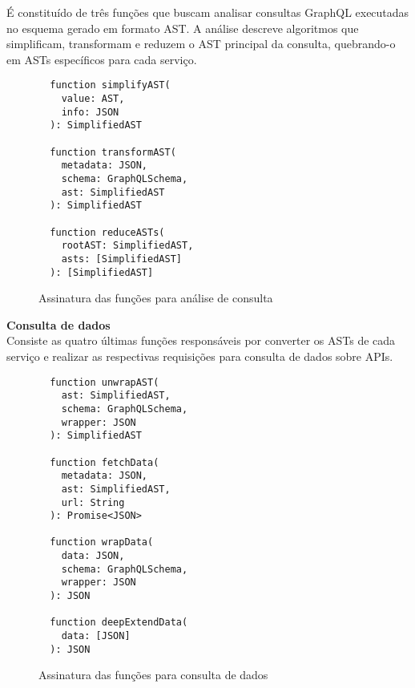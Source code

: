 É constituído de três funções que buscam analisar consultas GraphQL executadas no esquema gerado em formato AST. A análise descreve algoritmos que simplificam, transformam e reduzem o AST principal da consulta, quebrando-o em ASTs específicos para cada serviço.

\begin{figure}[H]
  \centering
  \begin{verbatim}
  function simplifyAST(
    value: AST,
    info: JSON
  ): SimplifiedAST

  function transformAST(
    metadata: JSON,
    schema: GraphQLSchema,
    ast: SimplifiedAST
  ): SimplifiedAST

  function reduceASTs(
    rootAST: SimplifiedAST,
    asts: [SimplifiedAST]
  ): [SimplifiedAST]
  \end{verbatim}
  \caption{Assinatura das funções para análise de consulta}
\end{figure}

\textbf{Consulta de dados} \\

Consiste as quatro últimas funções responsáveis por converter os ASTs de cada serviço e realizar as respectivas requisições para consulta de dados sobre APIs.

\begin{figure}[H]
  \centering
  \begin{verbatim}
  function unwrapAST(
    ast: SimplifiedAST,
    schema: GraphQLSchema,
    wrapper: JSON
  ): SimplifiedAST

  function fetchData(
    metadata: JSON,
    ast: SimplifiedAST,
    url: String
  ): Promise<JSON>

  function wrapData(
    data: JSON,
    schema: GraphQLSchema,
    wrapper: JSON
  ): JSON

  function deepExtendData(
    data: [JSON]
  ): JSON
  \end{verbatim}
  \caption{Assinatura das funções para consulta de dados}
\end{figure}
